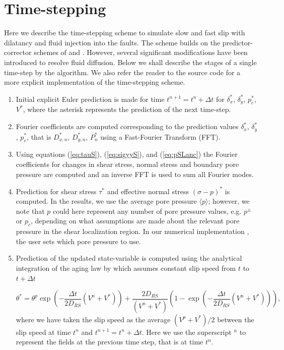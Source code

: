 \documentclass[draft]{agujournal2019}
\begin{document}
\section{Time-stepping} \label{sec:time}
Here we describe the time-stepping scheme to simulate slow and fast slip with dilatancy and fluid injection into the faults. The scheme builds on the predictor-corrector schemes of  and .  However, several significant modifications have been introduced to resolve fluid diffusion. Below we shall describe the stages of a single time-step by the algorithm. We also refer the reader to the source code \cite{elias_rafn_heimisson_Poro_SBIM} for a more explicit implementation of the time-stepping scheme. 
\begin{enumerate}

\item Initial explicit Euler prediction is made for time $t^{n+1} = t^n + \Delta t$ for $\delta_x^*$, $\delta_y^*$, $p_c^*$, $V^*$, where the asterisk represents the prediction of the next time-step.

\item Fourier coefficients are computed corresponding to the prediction values $\delta_x^*$, $\delta_y^*$, $p_c^*$, that is $D_{x,n}^*$, $D_{y,n}^*$, $P_{n}^*$ using a Fast-Fourier Transform (FFT).

\item Using equations (\ref{eq:tauS}), (\ref{eq:sigyyS}), and (\ref{eq:pSLanc}) the Fourier coefficients for changes in shear stress, normal stress and boundary pore pressure are computed and an inverse FFT is used to sum all Fourier modes.

\item Prediction for shear stress $\tau^*$ and effective normal stress $(\sigma - p)^*$ is computed. In the results, we use the average pore pressure $\langle p \rangle$; however, we note that $p$ could here represent any number of pore pressure values, e.g. $p^\pm$ or $p_c$, depending on what assumptions are made about the relevant pore pressure in the shear localization region. In our numerical implementation \cite{elias_rafn_heimisson_Poro_SBIM}, the user sets which pore pressure to use.

\item Prediction of the updated state-variable is computed using the analytical integration of the aging law by  which assumes constant slip speed from $t$ to $t + \Delta t$ 

\begin{equation}
    \theta^* = \theta^p \exp \left( - \frac{\Delta t}{2 D_{RS}} (V^n + V^*)  \right) + \frac{2 D_{RS}}{(V^n + V^*)} \left( 1 - \exp \left( - \frac{\Delta t}{2 D_{RS}} (V^n + V^*)  \right)  \right),
\end{equation}
where we have taken the slip speed as the average $(V^p + V^*)/2$ between the slip speed at time $t^n$ and $t^{n+1} = t^n + \Delta t$. Here we use the superscript $^n$ to represent the fields at the previous time step, that is at time $t^n$.


\end{enumerate}
\end{document}
